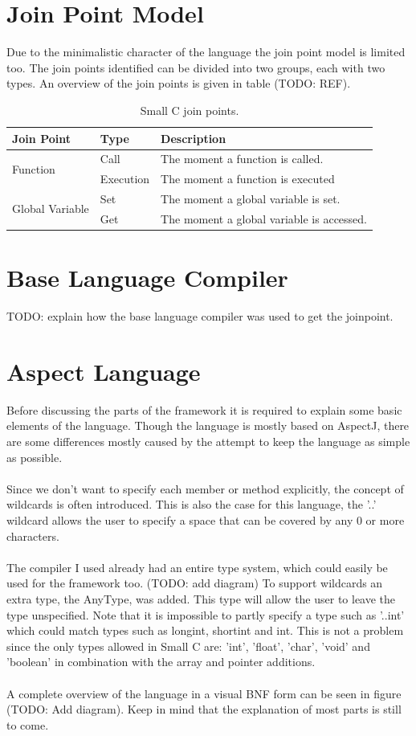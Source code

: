 \documentclass[a4paper]{report}
\begin{document}
\section{Join Point Model}
Due to the minimalistic character of the language the join point model is limited too. The join points identified can be divided into two groups, each with two types. An overview of the join points is given in table (TODO: REF).
\begin{table}
\centering
\begin{tabular}{|l|l|l|}
\hline
Join Point & Type & Description\\
\hline
\multirow{2}{*}{Function} & Call & The moment a function is called.\\
& Execution & The moment a function is executed\\
\hline
\multirow{2}{*}{Global Variable} & Set & The moment a global variable is set.\\
& Get & The moment a global variable is accessed.\\
\hline
\end{tabular}
\label{tab:SmallC_JoinPoints}
\caption{Small C join points.}
\end{table}

\section{Base Language Compiler}
TODO: explain how the base language compiler was used to get the joinpoint.

\section{Aspect Language}
Before discussing the parts of the framework it is required to explain some basic elements of the language. Though the language is mostly based on AspectJ, there are some differences mostly caused by the attempt to keep the language as simple as possible.\\
\\
Since we don't want to specify each member or method explicitly, the concept of wildcards is often introduced. This is also the case for this language, the '..' wildcard allows the user to specify a space that can be covered by any 0 or more characters.\\
\\
The compiler I used already had an entire type system, which could easily be used for the framework too. (TODO: add diagram) To support wildcards an extra type, the AnyType, was added. This type will allow the user to leave the type unspecified. Note that it is impossible to partly specify a type such as '..int' which could match types such as longint, shortint and int. This is not a problem since the only types allowed in Small C are: 'int', 'float', 'char', 'void' and 'boolean' in combination with the array and pointer additions.\\
\\
A complete overview of the language in a visual BNF form can be seen in figure (TODO: Add diagram). Keep in mind that the explanation of most parts is still to come.\\
\end{document}

